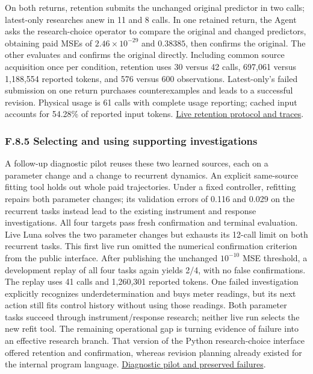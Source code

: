 \documentclass[twoside,11pt]{article}
\begin{document}
On both returns, retention submits the unchanged original predictor in two calls;
latest-only researches anew in 11 and 8 calls. In one retained return, the Agent
asks the research-choice operator to compare the original and changed predictors,
obtaining paid MSEs of \(2.46\times10^{-29}\) and \(0.38385\), then confirms the original.
The other evaluates and confirms the original directly. Including common source
acquisition once per condition, retention uses 30 versus 42 calls, 697,061 versus
1,188,554 reported tokens, and 576 versus 600 observations. Latest-only's failed
submission on one return purchases counterexamples and leads to a successful
revision. Physical usage is 61 calls with complete usage reporting; cached input
accounts for 54.28\% of reported input tokens.
\hyperlink{artifact-80}{Live retention protocol and traces}.


\subsubsection*{F.8.5 Selecting and using supporting investigations}

A follow-up diagnostic pilot reuses these two learned sources, each on a parameter
change and a change to recurrent dynamics. An explicit same-source fitting tool
holds out whole paid trajectories. Under a fixed controller, refitting repairs
both parameter changes; its validation errors of 0.116 and 0.029 on the recurrent
tasks instead lead to the existing instrument and response investigations.
All four targets pass fresh confirmation and terminal evaluation. Live Luna
solves the two parameter changes but exhausts its 12-call limit on both recurrent
tasks. This first live run omitted the numerical confirmation criterion from the
public interface. After publishing the unchanged \(10^{-10}\) MSE threshold, a
development replay of all four tasks again yields 2/4, with no false confirmations.
The replay uses 41 calls and 1,260,301 reported tokens. One failed investigation
explicitly recognizes underdetermination and buys meter readings, but its next
action still fits control history without using those readings. Both parameter
tasks succeed through instrument/response research; neither live run selects
the new refit tool. The remaining operational gap is turning evidence of failure
into an effective research branch. That version of the Python research-choice interface
offered retention and confirmation, whereas revision planning already existed for
the internal program language.
\hyperlink{artifact-81}{Diagnostic pilot and preserved failures}.
\end{document}
